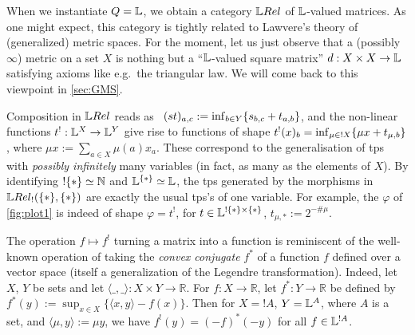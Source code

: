 
When we instantiate $Q=\mathbb{L}$, we obtain a category $\LREL$ of $\mathbb{L}$-valued matrices. As one might expect, this category is tightly related to Lawvere's theory of (generalized) metric spaces. For the moment, let us just observe that a (possibly $\infty$) metric on a set $X$ is nothing but a ``$\mathbb{L}$-valued square matrix'' $d:X\times X\to \mathbb{L}$ satisfying axioms like e.g.~the triangular law.
We will come back to this viewpoint in \autoref{sec:GMS}.

Composition in $\LREL$ %
reads as \ $(st)_{a,c}:=\inf_{b\in Y}\{s_{b,c}+t_{a,b}\}$, and the non-linear functions $t^{!}: \mathbb{L}^{X}\to \mathbb{L}^{Y}$ give rise to functions of shape 
$t^!(x)_b=\inf_{\mu\in !X} \{\mu x+ t_{\mu,b}\}$, where $\mu x:=\sum_{a\in X} \mu(a)x_a$. These correspond to the generalisation of tps with \emph{possibly infinitely} many variables (in fact, as many as the elements of $X$).
By identifying $!\{*\}\simeq \mathbb{N}$ and $\mathbb{L}^{\{*\}}\simeq\mathbb{L}$, the tps generated by the morphisms in $\HOM{\LREL_!}{\set{*}}{\set{*}}$ are exactly the %
usual tps's of one variable. %
For example, the $\varphi$ of \autoref{fig:plot1} is indeed of shape $\varphi=t^!$, for $t\in\mathbb{L}^{!\{*\}\times\{*\}}$, $t_{\mu,*}:=2^{-\# \mu}$.

\begin{remark}
The operation $f\mapsto f^{!}$ turning a matrix into a function is reminiscent of the well-known operation of taking the 
 \emph{convex conjugate} $f^*$ of a function $f$ defined over a vector space (itself a generalization of the Legendre transformation).
 Indeed, let $X$, $Y$ be sets and let $\langle \_,\_\rangle:X\times Y \to \mathbb{R}$.
 For $f:X\to \mathbb R$, let $f^*:Y\to \mathbb R$ be defined by $f^*(y):= \sup_{x\in X}\{\langle x,y\rangle - f(x)\}$.
 Then for $X=!A$, $Y=\mathbb{L}^A$, where $A$ is a set, and $\langle \mu, y \rangle:= \mu y$, we have $f^!(y)=(-f)^*(-y)$ for all $f\in\mathbb{L}^{!A}$.
\end{remark}

